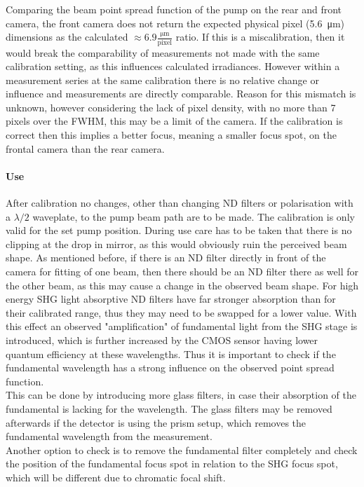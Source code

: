 \documentclass[twoside,openright,listof=numbered]{scrreprt}
\begin{document}
Comparing the beam point spread function of the pump on the rear and front camera, the front camera does not return the expected physical pixel (\qty{5.6}{\micro\meter}) dimensions as the calculated $\approx\mathrm{6.9\frac{\mu m}{pixel}}$ ratio. If this is a miscalibration, then it would break the comparability of measurements not made with the same calibration setting, as this influences calculated irradiances. However within a measurement series at the same calibration there is no relative change or influence and measurements are directly comparable. Reason for this mismatch is unknown, however considering the lack of pixel density, with no more than 7 pixels over the FWHM, this may be a limit of the camera. If the calibration is correct then this implies a better focus, meaning a smaller focus spot, on the frontal camera than the rear camera.

\paragraph{Use}
After calibration no changes, other than changing ND filters or polarisation with a $\lambda/2$ waveplate, to the pump beam path are to be made. The calibration is only valid for the set pump position. During use care has to be taken that there is no clipping at the drop in mirror, as this would obviously ruin the perceived beam shape. As mentioned before, if there is an ND filter directly in front of the camera for fitting of one beam, then there should be an ND filter there as well for the other beam, as this may cause a change in the observed beam shape. For high energy SHG light absorptive ND filters have far stronger absorption than for their calibrated range, thus they may need to be swapped for a lower value. With this effect an observed "amplification" of fundamental light from the SHG stage is introduced, which is further increased by the CMOS sensor having lower quantum efficiency at these wavelengths. Thus it is important to check if the fundamental wavelength has a strong influence on the observed point spread function.\\
This can be done by introducing more glass filters, in case their absorption of the fundamental is lacking for the wavelength. The glass filters may be removed afterwards if the detector is using the prism setup, which removes the fundamental wavelength from the measurement.\\
Another option to check is to remove the fundamental filter completely and check the position of the fundamental focus spot in relation to the SHG focus spot, which will be different due to chromatic focal shift.
\end{document}
